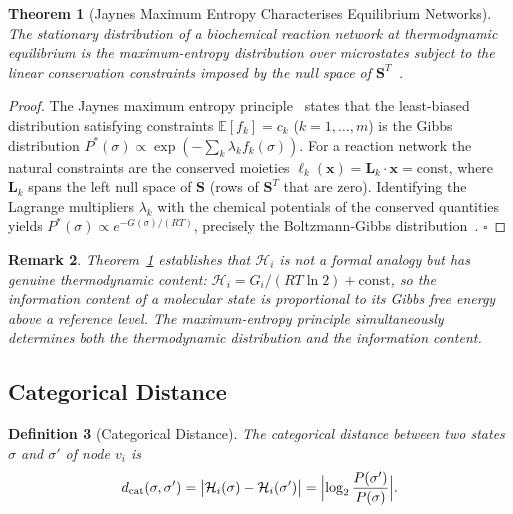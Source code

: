 \documentclass[twocolumn,10pt,a4paper]{article}
\newcommand{\Hcat}{\mathcal{H}}
\newcommand{\dcat}{d_{\mathrm{cat}}}
\newtheorem{theorem}{Theorem}[section]
\newtheorem{definition}[theorem]{Definition}
\newtheorem{remark}[theorem]{Remark}
\begin{document}
\begin{theorem}[Jaynes Maximum Entropy Characterises Equilibrium Networks]
\label{thm:jaynes}
The stationary distribution of a biochemical reaction network at thermodynamic
equilibrium is the maximum-entropy distribution over microstates subject to
the linear conservation constraints imposed by the null space of
$\mathbf{S}^T$~\cite{Jaynes1957}.
\end{theorem}

\begin{proof}
The Jaynes maximum entropy principle~\cite{Jaynes1957,CoverThomas2006} states
that the least-biased distribution satisfying constraints
$\mathbb{E}[f_k]=c_k$ ($k=1,\ldots,m$) is the Gibbs distribution
$P^*(\sigma)\propto\exp(-\sum_k\lambda_k f_k(\sigma))$.  For a reaction
network the natural constraints are the conserved moieties
$\ell_k(\mathbf{x})=\mathbf{L}_k\cdot\mathbf{x}=\mathrm{const}$, where
$\mathbf{L}_k$ spans the left null space of $\mathbf{S}$ (rows of $\mathbf{S}^T$
that are zero).  Identifying the Lagrange multipliers $\lambda_k$ with the
chemical potentials of the conserved quantities yields
$P^*(\sigma)\propto e^{-G(\sigma)/(RT)}$, precisely the Boltzmann-Gibbs
distribution~\cite{NichollsFerguson2002}.  $\square$
\end{proof}

\begin{remark}
Theorem~\ref{thm:jaynes} establishes that $\Hcat_i$ is not a formal analogy
but has genuine thermodynamic content: $\Hcat_i = G_i/(RT\ln 2) + \mathrm{const}$,
so the information content of a molecular state is proportional to its Gibbs
free energy above a reference level.  The maximum-entropy principle
simultaneously determines both the thermodynamic distribution and the
information content.
\end{remark}

\subsection{Categorical Distance}
\label{sec:info-catdist}

\begin{definition}[Categorical Distance]
\label{def:catdist}
The \emph{categorical distance} between two states $\sigma$ and $\sigma'$ of
node $v_i$ is
\begin{equation}
  \dcat(\sigma,\sigma') = \bigl|\Hcat_i(\sigma)-\Hcat_i(\sigma')\bigr|
                        = \Bigl|\log_2\frac{P(\sigma')}{P(\sigma)}\Bigr|.
  \label{eq:catdist}
\end{equation}
\end{definition}
\end{document}
